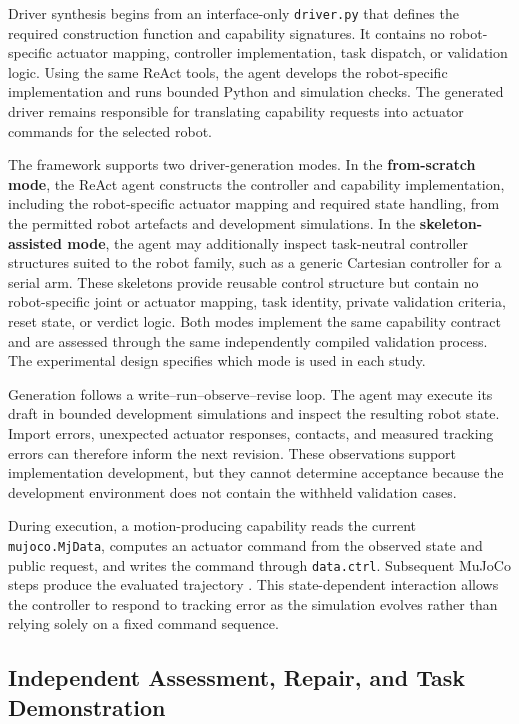 Driver synthesis begins from an interface-only \texttt{driver.py} that defines
the required construction function and capability signatures. It contains no
robot-specific actuator mapping, controller implementation, task dispatch, or
validation logic. Using the same ReAct tools, the agent develops the
robot-specific implementation and runs bounded Python and simulation checks.
The generated driver remains responsible for translating capability requests
into actuator commands for the selected robot.

The framework supports two driver-generation modes. In the
\textbf{from-scratch mode}, the ReAct agent constructs the controller and
capability implementation, including the robot-specific actuator mapping and
required state handling, from the permitted robot artefacts and development
simulations. In the \textbf{skeleton-assisted mode}, the agent may additionally
inspect task-neutral controller structures suited to the robot family, such as
a generic Cartesian controller for a serial arm. These skeletons provide
reusable control structure but contain no robot-specific joint or actuator
mapping, task identity, private validation criteria, reset state, or verdict
logic. Both modes implement the same capability contract and are assessed
through the same independently compiled validation process. The experimental
design specifies which mode is used in each study.

Generation follows a write--run--observe--revise loop. The agent may execute
its draft in bounded development simulations and inspect the resulting robot
state. Import errors, unexpected actuator responses, contacts, and measured
tracking errors can therefore inform the next revision. These observations
support implementation development, but they cannot determine acceptance
because the development environment does not contain the withheld validation
cases.

During execution, a motion-producing capability reads the current
\texttt{mujoco.MjData}, computes an actuator command from the observed state
and public request, and writes the command through \texttt{data.ctrl}.
Subsequent MuJoCo steps produce the evaluated trajectory
\citep{todorov2012mujoco}. This state-dependent interaction allows the
controller to respond to tracking error as the simulation evolves rather than
relying solely on a fixed command sequence.

\subsection{Independent Assessment, Repair, and Task Demonstration}

